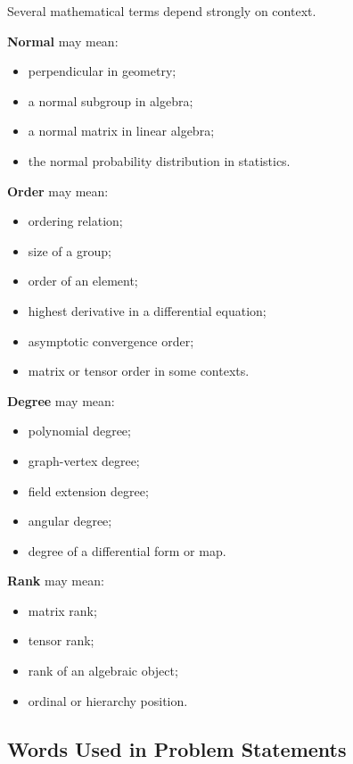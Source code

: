 Several mathematical terms depend strongly on context.

\textbf{Normal} may mean:

\begin{itemize}
    \item perpendicular in geometry;
    \item a normal subgroup in algebra;
    \item a normal matrix in linear algebra;
    \item the normal probability distribution in statistics.
\end{itemize}

\textbf{Order} may mean:

\begin{itemize}
    \item ordering relation;
    \item size of a group;
    \item order of an element;
    \item highest derivative in a differential equation;
    \item asymptotic convergence order;
    \item matrix or tensor order in some contexts.
\end{itemize}

\textbf{Degree} may mean:

\begin{itemize}
    \item polynomial degree;
    \item graph-vertex degree;
    \item field extension degree;
    \item angular degree;
    \item degree of a differential form or map.
\end{itemize}

\textbf{Rank} may mean:

\begin{itemize}
    \item matrix rank;
    \item tensor rank;
    \item rank of an algebraic object;
    \item ordinal or hierarchy position.
\end{itemize}

\subsection{Words Used in Problem Statements}
\label{subsec:problem-statement-terminology}

